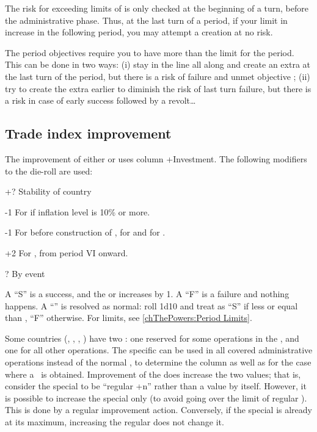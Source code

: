 \begin{designnote}
  The risk for exceeding limits of \MNU is only checked at the beginning of a
  turn, before the administrative phase. Thus, at the last turn of a period,
  if your limit in \MNU increase in the following period, you may attempt a
  \MNU creation at no risk.

  The \MNU period objectives require you to have more \MNU than the limit for
  the period. This can be done in two ways: (i) stay in the line all along and
  create an extra \MNU at the last turn of the period, but there is a risk of
  failure and unmet objective ; (ii) try to create the extra \MNU earlier to
  diminish the risk of last turn failure, but there is a risk in case of early
  success followed by a revolt\ldots
\end{designnote}



\subsection{Trade index improvement}

\aparag The improvement of either \FTI or \DTI uses column +Investment.
\bparag The following modifiers to the die-roll are used:
\begin{modlist}
\item[+?]Stability of country
\item[-1]For \SPA if inflation level is 10\% or more.
\item[-1]For \RUS before construction of , for \TUR
  and for \POL.
\item[+2]For \ENG, from period VI onward.
\item[\textplusminus?]By event
\end{modlist}
\bparag A ``S'' is a success, and the \FTI or \DTI increases by 1.
\bparag A ``F'' is a failure and nothing happens.
\bparag A ``\undemi'' is resolved as normal: roll 1d10 and treat as ``S'' if
less or equal than \FTI, ``F'' otherwise.
\bparag For limits, see \ref{chThePowers:Period Limits}.

\label{chExpenses:Special FTI} Some countries
(\POR, \RUS, \SPA, \HOL) have two \FTI: one reserved for some operations in
the \ROTW, and one for all other operations.
\bparag The specific \FTI can be used in all covered administrative operations
instead of the normal \FTI, to determine the column as well as for the case
where a \undemi\ is obtained.
\bparag Improvement of the \FTI does increase the two values; that is,
consider the special \FTI to be ``regular \FTI +n'' rather than a value by
itself.
\bparag However, it is possible to increase the special \FTI only (to avoid
going over the limit of regular \FTI). This is done by a regular \FTI
improvement action.
\bparag Conversely, if the special \FTI is already at its maximum, increasing
the regular \FTI does not change it.

